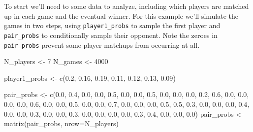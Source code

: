 \documentclass[
  letterpaper,
  DIV=11,
  numbers=noendperiod]{scrartcl}
\newenvironment{Shaded}{\begin{snugshade}}{\end{snugshade}}
\newcommand{\AttributeTok}[1]{\textcolor[rgb]{0.40,0.45,0.13}{#1}}
\newcommand{\DecValTok}[1]{\textcolor[rgb]{0.68,0.00,0.00}{#1}}
\newcommand{\FloatTok}[1]{\textcolor[rgb]{0.68,0.00,0.00}{#1}}
\newcommand{\FunctionTok}[1]{\textcolor[rgb]{0.28,0.35,0.67}{#1}}
\newcommand{\NormalTok}[1]{\textcolor[rgb]{0.00,0.23,0.31}{#1}}
\newcommand{\OtherTok}[1]{\textcolor[rgb]{0.00,0.23,0.31}{#1}}
\begin{document}
To start we'll need to some data to analyze, including which players are
matched up in each game and the eventual winner. For this example we'll
simulate the games in two steps, using \texttt{player1\_probs} to sample
the first player and \texttt{pair\_probs} to conditionally sample their
opponent. Note the zeroes in \texttt{pair\_probs} prevent some player
matchups from occurring at all.

\begin{Shaded}
\begin{Highlighting}[]
\NormalTok{N\_players }\OtherTok{\textless{}{-}} \DecValTok{7}
\NormalTok{N\_games }\OtherTok{\textless{}{-}} \DecValTok{4000}

\NormalTok{player1\_probs }\OtherTok{\textless{}{-}} \FunctionTok{c}\NormalTok{(}\FloatTok{0.2}\NormalTok{, }\FloatTok{0.16}\NormalTok{, }\FloatTok{0.19}\NormalTok{, }\FloatTok{0.11}\NormalTok{, }\FloatTok{0.12}\NormalTok{, }\FloatTok{0.13}\NormalTok{, }\FloatTok{0.09}\NormalTok{)}

\NormalTok{pair\_probs }\OtherTok{\textless{}{-}} \FunctionTok{c}\NormalTok{(}\FloatTok{0.0}\NormalTok{, }\FloatTok{0.4}\NormalTok{, }\FloatTok{0.0}\NormalTok{, }\FloatTok{0.0}\NormalTok{, }\FloatTok{0.5}\NormalTok{, }\FloatTok{0.0}\NormalTok{, }\FloatTok{0.0}\NormalTok{,}
                \FloatTok{0.5}\NormalTok{, }\FloatTok{0.0}\NormalTok{, }\FloatTok{0.0}\NormalTok{, }\FloatTok{0.0}\NormalTok{, }\FloatTok{0.2}\NormalTok{, }\FloatTok{0.6}\NormalTok{, }\FloatTok{0.0}\NormalTok{,}
                \FloatTok{0.0}\NormalTok{, }\FloatTok{0.0}\NormalTok{, }\FloatTok{0.0}\NormalTok{, }\FloatTok{0.6}\NormalTok{, }\FloatTok{0.0}\NormalTok{, }\FloatTok{0.0}\NormalTok{, }\FloatTok{0.5}\NormalTok{,}
                \FloatTok{0.0}\NormalTok{, }\FloatTok{0.0}\NormalTok{, }\FloatTok{0.7}\NormalTok{, }\FloatTok{0.0}\NormalTok{, }\FloatTok{0.0}\NormalTok{, }\FloatTok{0.0}\NormalTok{, }\FloatTok{0.5}\NormalTok{,}
                \FloatTok{0.5}\NormalTok{, }\FloatTok{0.3}\NormalTok{, }\FloatTok{0.0}\NormalTok{, }\FloatTok{0.0}\NormalTok{, }\FloatTok{0.0}\NormalTok{, }\FloatTok{0.4}\NormalTok{, }\FloatTok{0.0}\NormalTok{,}
                \FloatTok{0.0}\NormalTok{, }\FloatTok{0.3}\NormalTok{, }\FloatTok{0.0}\NormalTok{, }\FloatTok{0.0}\NormalTok{, }\FloatTok{0.3}\NormalTok{, }\FloatTok{0.0}\NormalTok{, }\FloatTok{0.0}\NormalTok{,}
                \FloatTok{0.0}\NormalTok{, }\FloatTok{0.0}\NormalTok{, }\FloatTok{0.3}\NormalTok{, }\FloatTok{0.4}\NormalTok{, }\FloatTok{0.0}\NormalTok{, }\FloatTok{0.0}\NormalTok{, }\FloatTok{0.0}\NormalTok{)}
\NormalTok{pair\_probs }\OtherTok{\textless{}{-}}  \FunctionTok{matrix}\NormalTok{(pair\_probs, }\AttributeTok{nrow=}\NormalTok{N\_players)}
\end{Highlighting}
\end{Shaded}
\end{document}
